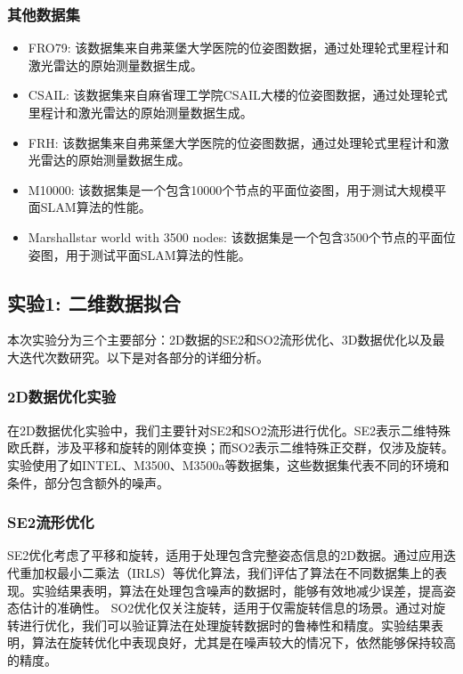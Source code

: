 \documentclass{ctexart}
\begin{document}
\subsubsection{其他数据集\cite{carlone2014first, olson2006fast, olson2006fastb}}

\begin{itemize}
	\item FRO79: 该数据集来自弗莱堡大学医院的位姿图数据，通过处理轮式里程计和激光雷达的原始测量数据生成。
	\item CSAIL: 该数据集来自麻省理工学院CSAIL大楼的位姿图数据，通过处理轮式里程计和激光雷达的原始测量数据生成。
	\item FRH: 该数据集来自弗莱堡大学医院的位姿图数据，通过处理轮式里程计和激光雷达的原始测量数据生成。
	\item M10000: 该数据集是一个包含10000个节点的平面位姿图，用于测试大规模平面SLAM算法的性能。
	\item Marshallstar world with 3500 nodes: 该数据集是一个包含3500个节点的平面位姿图，用于测试平面SLAM算法的性能。
\end{itemize}


\subsection{实验1: 二维数据拟合}
本次实验分为三个主要部分：2D数据的SE2和SO2流形优化、3D数据优化以及最大迭代次数研究。以下是对各部分的详细分析。

\subsubsection{2D数据优化实验}

在2D数据优化实验中，我们主要针对SE2和SO2流形进行优化。SE2表示二维特殊欧氏群，涉及平移和旋转的刚体变换；而SO2表示二维特殊正交群，仅涉及旋转。实验使用了如INTEL、M3500、M3500a等数据集，这些数据集代表不同的环境和条件，部分包含额外的噪声。

\subsubsection{SE2流形优化}

SE2优化考虑了平移和旋转，适用于处理包含完整姿态信息的2D数据。通过应用迭代重加权最小二乘法（IRLS）等优化算法，我们评估了算法在不同数据集上的表现。实验结果表明，算法在处理包含噪声的数据时，能够有效地减少误差，提高姿态估计的准确性。
SO2优化仅关注旋转，适用于仅需旋转信息的场景。通过对旋转进行优化，我们可以验证算法在处理旋转数据时的鲁棒性和精度。实验结果表明，算法在旋转优化中表现良好，尤其是在噪声较大的情况下，依然能够保持较高的精度。
\end{document}
